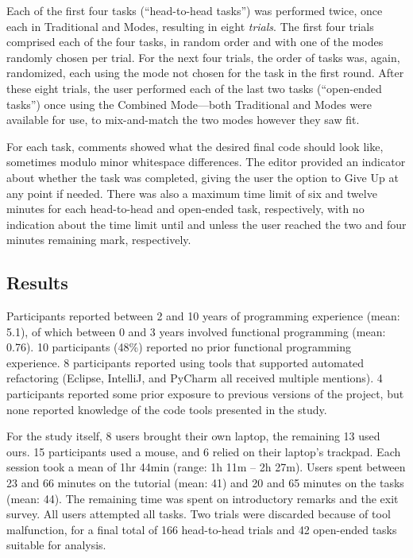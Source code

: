 Each of the first four tasks (``head-to-head tasks'') was performed twice, once
each in Traditional and \deuce{} Modes, resulting in eight \emph{trials}. The first four trials
comprised each of the four tasks, in random order and with one of the modes
randomly chosen per trial. For the next four trials, the order of tasks was, again,
randomized, each using the mode not chosen for the task in the first round.
%
After these eight trials, the user performed each of the last two tasks
(``open-ended tasks'') once using the Combined Mode---both Traditional and
\deuce{} Modes were available for use, to mix-and-match the two modes however
they saw fit.

For each task, comments showed what the desired final code should look like,
sometimes modulo minor whitespace differences. The editor provided an
indicator about whether the task was completed, giving the user the option to
Give Up at any point if needed. There was also a maximum time limit of six and
twelve minutes for each head-to-head and open-ended task, respectively, with no
indication about the time limit until and unless the user reached the two
and four minutes remaining mark, respectively.


\subsection{Results}
\label{sec:user-study-results}

Participants reported between 2 and 10 years of programming experience (mean: 5.1), of which
between 0 and 3 years involved functional programming (mean: 0.76). 10 participants (48\%)
reported no prior functional programming experience.
%
8 participants reported using tools that supported automated refactoring (Eclipse, IntelliJ, and
PyCharm all received multiple mentions). 4 participants reported some prior exposure to
previous versions of the \sns{} project, but none reported knowledge of the code tools presented
in the study.

For the study itself, 8 users brought their own laptop, the remaining 13 used
ours. 15 participants used a mouse, and 6 relied on their laptop's trackpad.
%
Each session took a mean of 1hr 44min (range: 1h 11m -- 2h 27m). Users spent between 23 and 66
minutes on the tutorial (mean: 41) and 20 and 65 minutes on the tasks (mean: 44). The remaining
time was spent on introductory remarks and the exit survey.
%
All users attempted all tasks. Two trials were discarded because of tool malfunction,
for a final total of 166 head-to-head trials and 42 open-ended tasks suitable for analysis.

